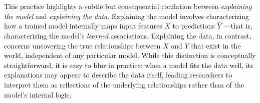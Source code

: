 \documentclass[mnsc,blindrev]{informs3}
\begin{document}




This practice highlights a subtle but consequential conflation between \textit{explaining the model} and \textit{explaining the data}. Explaining the model involves characterizing how a trained model internally maps input features $X$ to predictions $\hat{Y}$
—that is, characterizing the model’s \textit{learned} associations. Explaining the data, in contrast, concerns uncovering the true relationships between $X$ and $Y$ that exist in the world, independent of any particular model. While this distinction is conceptually straightforward, it is easy to blur in practice: when a model fits the data well, its explanations may appear to describe the data itself, leading researchers to interpret them as reflections of the underlying relationships rather than of the model’s internal logic.
\end{document}
